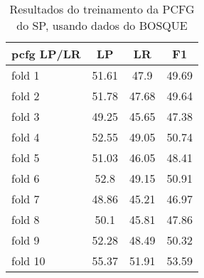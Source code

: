 \begin{table}[!h]
    \centering
    \begin{tabular}{|l|c|c|c|}
        \hline
        pcfg LP/LR & LP & LR & F1\\
        \hline
        fold 1 & 51.61 & 47.9 & 49.69\\
        fold 2 & 51.78 & 47.68 & 49.64\\
        fold 3 & 49.25 & 45.65 & 47.38\\
        fold 4 & 52.55 & 49.05 & 50.74\\
        fold 5 & 51.03 & 46.05 & 48.41\\
        fold 6 & 52.8 & 49.15 & 50.91\\
        fold 7 & 48.86 & 45.21 & 46.97\\
        fold 8 & 50.1 & 45.81 & 47.86\\
        fold 9 & 52.28 & 48.49 & 50.32\\
        fold 10 & 55.37 & 51.91 & 53.59\\
        \hline
    \end{tabular}
    \caption{Resultados do treinamento da PCFG do SP, usando dados do BOSQUE}
    \label{tab:result_bosque_pcfg}
\end{table}
